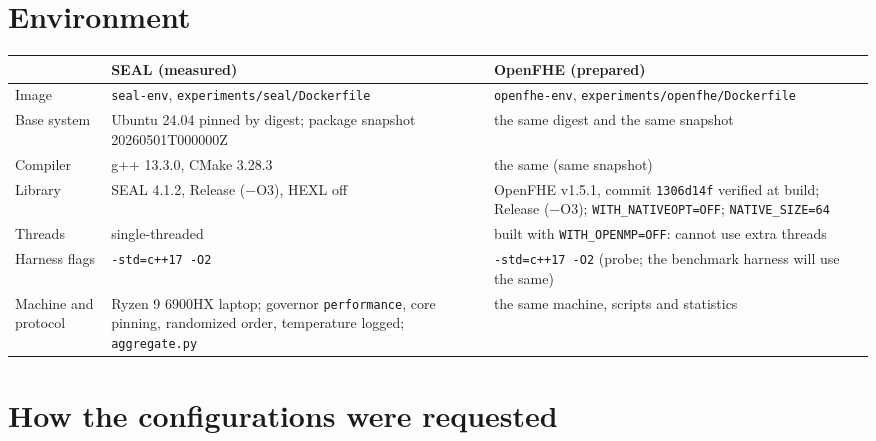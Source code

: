 \documentclass[11pt]{article}
\begin{document}
\section{Environment}
\label{sec:env}

\begin{center}\footnotesize
\begin{tabular}{@{}L{3.0cm}L{6.4cm}L{6.4cm}@{}}
\toprule
& \textbf{SEAL (measured)} & \textbf{OpenFHE (prepared)} \\
\midrule
Image & \texttt{seal-env}, \texttt{experiments/seal/Dockerfile} & \texttt{openfhe-env}, \texttt{experiments/openfhe/Dockerfile} \\
Base system & Ubuntu 24.04 pinned by digest; package snapshot 20260501T000000Z & the same digest and the same snapshot \\
Compiler & g++ 13.3.0, CMake 3.28.3 & the same (same snapshot) \\
Library & SEAL 4.1.2, Release ($-$O3), HEXL off & OpenFHE v1.5.1, commit \texttt{1306d14f} verified at build; Release ($-$O3); \texttt{WITH\_NATIVEOPT=OFF}; \texttt{NATIVE\_SIZE=64} \\
Threads & single-threaded & built with \texttt{WITH\_OPENMP=OFF}: cannot use extra threads \\
Harness flags & \texttt{-std=c++17 -O2} & \texttt{-std=c++17 -O2} (probe; the benchmark harness will use the same) \\
Machine and protocol & Ryzen 9 6900HX laptop; governor \texttt{performance}, core pinning, randomized order, temperature logged; \texttt{aggregate.py} & the same machine, scripts and statistics \\
\bottomrule
\end{tabular}
\end{center}

\section{How the configurations were requested}
\label{sec:requests}
\end{document}
